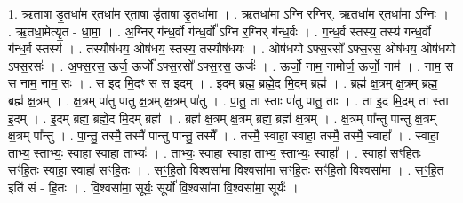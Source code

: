 \documentclass[17pt]{extarticle}
\begin{document}
1. ऋ॒ता॒षा डृ॒तधा॑म॒ र्‌तधा॑म र्‌ता॒षा डृ॑ता॒षा डृ॒तधा॑मा । . ऋ॒तधा॑मा॒ ऽग्नि र॒ग्निर्. ऋ॒तधा॑म॒ र्‌तधा॑मा॒ ऽग्निः । . ऋ॒तधा॒मेत्यृ॒त - धा॒मा॒ । . अ॒ग्निर् ग॑न्ध॒र्वो ग॑न्ध॒र्वो᳚ ऽग्नि र॒ग्निर् ग॑न्ध॒र्वः । . ग॒न्ध॒र्व स्तस्य॒ तस्य॑ गन्ध॒र्वो ग॑न्ध॒र्व स्तस्य॑ । . तस्यौष॑धय॒ ओष॑धय॒ स्तस्य॒ तस्यौष॑धयः । . ओष॑धयो ऽफ्स॒रसो᳚ ऽफ्स॒रस॒ ओष॑धय॒ ओष॑धयो ऽफ्स॒रसः॑ । . अ॒फ्स॒रस॒ ऊर्ज॒ ऊर्जो᳚ ऽफ्स॒रसो᳚ ऽफ्स॒रस॒ ऊर्जः॑ । . ऊर्जो॒ नाम॒ नामोर्ज॒ ऊर्जो॒ नाम॑ । . नाम॒ स स नाम॒ नाम॒ सः । . स इ॒द मि॒दꣳ स स इ॒दम् । . इ॒दम् ब्रह्म॒ ब्रह्मे॒द मि॒दम् ब्रह्म॑ । . ब्रह्म॑ क्ष॒त्रम् क्ष॒त्रम् ब्रह्म॒ ब्रह्म॑ क्ष॒त्रम् । . क्ष॒त्रम् पा॑तु पातु क्ष॒त्रम् क्ष॒त्रम् पा॑तु । . पा॒तु॒ ता स्ताः पा॑तु पातु॒ ताः । . ता इ॒द मि॒दम् ता स्ता इ॒दम् । . इ॒दम् ब्रह्म॒ ब्रह्मे॒द मि॒दम् ब्रह्म॑ । . ब्रह्म॑ क्ष॒त्रम् क्ष॒त्रम् ब्रह्म॒ ब्रह्म॑ क्ष॒त्रम् । . क्ष॒त्रम् पा᳚न्तु पान्तु क्ष॒त्रम् क्ष॒त्रम् पा᳚न्तु । . पा॒न्तु॒ तस्मै॒ तस्मै॑ पान्तु पान्तु॒ तस्मै᳚ । . तस्मै॒ स्वाहा॒ स्वाहा॒ तस्मै॒ तस्मै॒ स्वाहा᳚ । . स्वाहा॒ ताभ्य॒ स्ताभ्यः॒ स्वाहा॒ स्वाहा॒ ताभ्यः॑ । . ताभ्यः॒ स्वाहा॒ स्वाहा॒ ताभ्य॒ स्ताभ्यः॒ स्वाहा᳚ । . स्वाहा॑ सꣳहि॒तः सꣳ॑हि॒तः स्वाहा॒ स्वाहा॑ सꣳहि॒तः । . सꣳ॒॒हि॒तो वि॒श्वसा॑मा वि॒श्वसा॑मा सꣳहि॒तः सꣳ॑हि॒तो वि॒श्वसा॑मा । . सꣳ॒॒हि॒त इति॑ सं - हि॒तः । . वि॒श्वसा॑मा॒ सूर्यः॒ सूर्यो॑ वि॒श्वसा॑मा वि॒श्वसा॑मा॒ सूर्यः॑ । \newline
\end{document}
